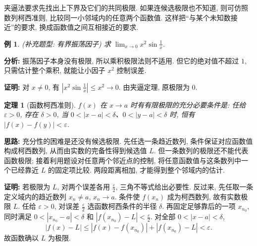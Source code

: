 \documentclass[UTF8,openany]{ctexbook}
\theoremstyle{chinesetextbook}
\newtheorem{example}{例}[section]
\newtheorem{theorem}{定理}[section]
\newenvironment{cnproof}{\par\indent\textbf{证明:} \ignorespaces}{\par}
\begin{document}
夹逼法要求先找出上下界及它们的共同极限. 如果连候选极限也不知道, 则可仿照数列柯西准则, 比较同一小邻域内的任意两个函数值. 这样把“与某个未知数接近”的要求, 换成函数值之间互相接近的要求.
\begin{example}
(补充题型: 有界振荡因子) 求 $\displaystyle\lim_{x\to0}x^2\sin\frac1x$.
\end{example}
\par\indent\textbf{分析:} 振荡因子本身没有极限, 所以乘积极限法则不适用. 但它的绝对值不超过 $1$, 只需估计整个乘积, 就能让小因子 $x^2$ 控制误差.
\begin{cnproof}
对 $x\ne0$, 有 $\displaystyle\left|x^2\sin\frac1x\right|\le x^2\to0$. 由夹逼定理, 原极限为 $0$.
\end{cnproof}
\begin{theorem}[函数柯西准则]
$f(x)$ 在 $x\to a$ 时有有限极限的充分必要条件是: 任给 $\varepsilon>0$, 存在 $\delta>0$, 当 $0<|x-a|<\delta$、$0<|y-a|<\delta$ 时, 恒有 $|f(x)-f(y)|<\varepsilon$.
\end{theorem}
\par\indent\textbf{思路:} 充分性的困难是还没有候选极限. 先任选一条趋近数列, 条件保证对应函数值构成柯西数列, 从而由实数的完备性得到候选值 $L$. 但一条数列的极限还不能代表函数极限; 接着利用题设对任意两个邻近点的控制, 将任意函数值与这条数列中一个已经靠近 $L$ 的固定项比较. 两段距离相加, 才能得到整个邻域内的估计.
\begin{cnproof}
若极限为 $L$, 对两个误差各用 $\displaystyle \frac\varepsilon2$, 三角不等式给出必要性. 反过来, 先任取一条定义域内的趋近数列 $x_n\ne a$, $x_n\to a$. 条件使 $f(x_n)$ 成为柯西数列, 故有实数极限 $L$. 任给 $\varepsilon>0$, 对误差 $\displaystyle \frac\varepsilon2$ 选函数柯西条件的半径 $\delta$. 再固定足够靠后的一项 $x_{n_0}$, 同时满足 $0<|x_{n_0}-a|<\delta$ 和 $\displaystyle |f(x_{n_0})-L|<\frac\varepsilon2$. 对全部 $0<|x-a|<\delta$,
\[
|f(x)-L|\le|f(x)-f(x_{n_0})|+|f(x_{n_0})-L|<\varepsilon.
\]
故函数确以 $L$ 为极限.
\end{cnproof}
\end{document}
